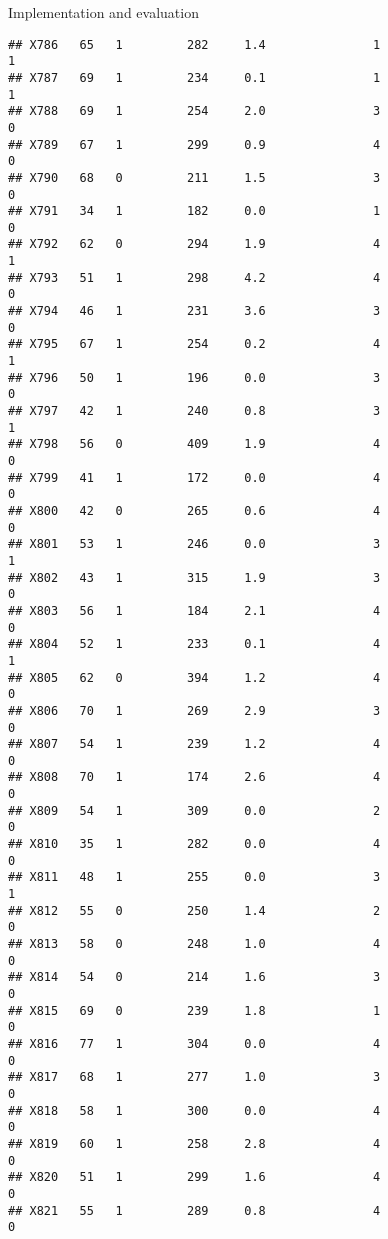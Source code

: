 \documentclass[
  ignorenonframetext,
]{beamer}
\begin{document}
\begin{frame}[fragile]{Implementation and evaluation}
\begin{verbatim}
## X786   65   1         282     1.4               1                   1
## X787   69   1         234     0.1               1                   1
## X788   69   1         254     2.0               3                   0
## X789   67   1         299     0.9               4                   0
## X790   68   0         211     1.5               3                   0
## X791   34   1         182     0.0               1                   0
## X792   62   0         294     1.9               4                   1
## X793   51   1         298     4.2               4                   0
## X794   46   1         231     3.6               3                   0
## X795   67   1         254     0.2               4                   1
## X796   50   1         196     0.0               3                   0
## X797   42   1         240     0.8               3                   1
## X798   56   0         409     1.9               4                   0
## X799   41   1         172     0.0               4                   0
## X800   42   0         265     0.6               4                   0
## X801   53   1         246     0.0               3                   1
## X802   43   1         315     1.9               3                   0
## X803   56   1         184     2.1               4                   0
## X804   52   1         233     0.1               4                   1
## X805   62   0         394     1.2               4                   0
## X806   70   1         269     2.9               3                   0
## X807   54   1         239     1.2               4                   0
## X808   70   1         174     2.6               4                   0
## X809   54   1         309     0.0               2                   0
## X810   35   1         282     0.0               4                   0
## X811   48   1         255     0.0               3                   1
## X812   55   0         250     1.4               2                   0
## X813   58   0         248     1.0               4                   0
## X814   54   0         214     1.6               3                   0
## X815   69   0         239     1.8               1                   0
## X816   77   1         304     0.0               4                   0
## X817   68   1         277     1.0               3                   0
## X818   58   1         300     0.0               4                   0
## X819   60   1         258     2.8               4                   0
## X820   51   1         299     1.6               4                   0
## X821   55   1         289     0.8               4                   0

\end{verbatim}
\end{frame}
\end{document}
